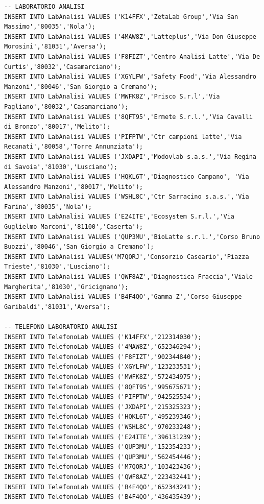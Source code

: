 \documentclass[12pt]{report}
\begin{document}
\begin{scriptsize}
\begin{verbatim}
-- LABORATORIO ANALISI
INSERT INTO LabAnalisi VALUES ('K14FFX','ZetaLab Group','Via San Massimo','80035','Nola');
INSERT INTO LabAnalisi VALUES ('4MAW8Z','Latteplus','Via Don Giuseppe Morosini','81031','Aversa');
INSERT INTO LabAnalisi VALUES ('F8FIZT','Centro Analisi Latte','Via De Curtis','80032','Casamarciano');
INSERT INTO LabAnalisi VALUES ('XGYLFW','Safety Food','Via Alessandro Manzoni','80046','San Giorgio a Cremano');
INSERT INTO LabAnalisi VALUES ('MWFK8Z','Prisco S.r.l','Via Pagliano','80032','Casamarciano');
INSERT INTO LabAnalisi VALUES ('8QFT95','Ermete S.r.l.','Via Cavalli di Bronzo','80017','Melito');
INSERT INTO LabAnalisi VALUES ('PIFPTW','Ctr campioni latte','Via Recanati','80058','Torre Annunziata');
INSERT INTO LabAnalisi VALUES ('JXDAPI','Modovlab s.a.s.','Via Regina di Savoia','81030','Lusciano');
INSERT INTO LabAnalisi VALUES ('HQKL6T','Diagnostico Campano', 'Via Alessandro Manzoni','80017','Melito');
INSERT INTO LabAnalisi VALUES ('WSHL8C','Ctr Sarracino s.a.s.','Via Farina','80035','Nola');
INSERT INTO LabAnalisi VALUES ('E24ITE','Ecosystem S.r.l.','Via Guglielmo Marconi','81100','Caserta');
INSERT INTO LabAnalisi VALUES ('QUP3MU','BioLatte s.r.l.','Corso Bruno Buozzi','80046','San Giorgio a Cremano');
INSERT INTO LabAnalisi VALUES('M7QORJ','Consorzio Caseario','Piazza Trieste','81030','Lusciano');
INSERT INTO LabAnalisi VALUES ('QWF8AZ','Diagnostica Fraccia','Viale Margherita','81030','Gricignano');
INSERT INTO LabAnalisi VALUES ('B4F4QO','Gamma Z','Corso Giuseppe Garibaldi','81031','Aversa');

-- TELEFONO LABORATORIO ANALISI
INSERT INTO TelefonoLab VALUES ('K14FFX','212314030');
INSERT INTO TelefonoLab VALUES ('4MAW8Z','652346294');
INSERT INTO TelefonoLab VALUES ('F8FIZT','902344840');
INSERT INTO TelefonoLab VALUES ('XGYLFW','123233531');
INSERT INTO TelefonoLab VALUES ('MWFK8Z','572434975');
INSERT INTO TelefonoLab VALUES ('8QFT95','995675671');
INSERT INTO TelefonoLab VALUES ('PIFPTW','942525534');
INSERT INTO TelefonoLab VALUES ('JXDAPI','215325323');
INSERT INTO TelefonoLab VALUES ('HQKL6T','495239346');
INSERT INTO TelefonoLab VALUES ('WSHL8C','970233248');
INSERT INTO TelefonoLab VALUES ('E24ITE','396131239');
INSERT INTO TelefonoLab VALUES ('QUP3MU','152354233');
INSERT INTO TelefonoLab VALUES ('QUP3MU','562454446');
INSERT INTO TelefonoLab VALUES ('M7QORJ','103423436');
INSERT INTO TelefonoLab VALUES ('QWF8AZ','223432441');
INSERT INTO TelefonoLab VALUES ('B4F4QO','652343241');
INSERT INTO TelefonoLab VALUES ('B4F4QO','436435439');


\end{verbatim}
\end{scriptsize}
\end{document}
